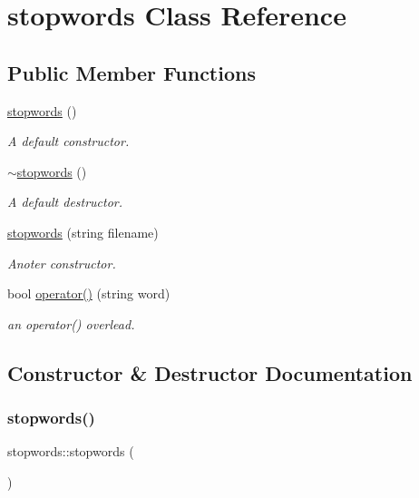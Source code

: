 \hypertarget{classstopwords}{}\section{stopwords Class Reference}
\label{classstopwords}
\subsection*{Public Member Functions}
\begin{DoxyCompactItemize}
\item 
\hyperlink{classstopwords_ae07cdf9173446ac3ff166c26ba7f05d4}{stopwords} ()
\begin{DoxyCompactList}\small\item\em A default constructor. \end{DoxyCompactList}\item 
\mbox{\label{classstopwords_acc1fd23d272a96a69860f185360df992}} 
\hyperlink{classstopwords_acc1fd23d272a96a69860f185360df992}{$\sim$stopwords} ()
\begin{DoxyCompactList}\small\item\em A default destructor. \end{DoxyCompactList}\item 
\hyperlink{classstopwords_a726865f116a88b84c2239e80a1fb872a}{stopwords} (string filename)
\begin{DoxyCompactList}\small\item\em Anoter constructor. \end{DoxyCompactList}\item 
bool \hyperlink{classstopwords_a7e237ef49803d27b80d5efcca17f53b3}{operator()} (string word)
\begin{DoxyCompactList}\small\item\em an operator() overlead. \end{DoxyCompactList}\end{DoxyCompactItemize}


\subsection{Constructor \& Destructor Documentation}
\mbox{\label{classstopwords_ae07cdf9173446ac3ff166c26ba7f05d4}} 
\subsubsection{\texorpdfstring{stopwords()}{stopwords()}\hspace{0.1cm}{\footnotesize\ttfamily [1/2]}}
{\footnotesize\ttfamily stopwords\+::stopwords (\begin{DoxyParamCaption}{ }\end{DoxyParamCaption})}



